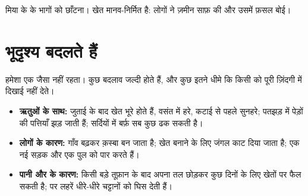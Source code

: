 \begin{omfigure}

{\small मिया के  के भागों को छाँटना। खेत मानव-निर्मित है: लोगों ने
ज़मीन साफ़ की और उसमें फ़सल बोई।}
\label{fig:g1:landscapes-around-us:sort}
\end{omfigure}

\section{भूदृश्य बदलते हैं}

 हमेशा एक जैसा नहीं रहता। कुछ बदलाव जल्दी होते हैं, और कुछ इतने
धीमे कि किसी को पूरी ज़िंदगी में दिखाई नहीं देते।
\begin{itemize}
  \item \textbf{ऋतुओं के साथ:} जुताई के बाद खेत भूरे होते हैं, वसंत में
        हरे, कटाई से पहले सुनहरे; पतझड़ में पेड़ों की पत्तियाँ झड़ जाती हैं;
        सर्दियों में बर्फ़ सब कुछ ढक सकती है।
  \item \textbf{लोगों के कारण:} गाँव बढ़कर क़स्बा बन जाता है; खेत बनाने के
        लिए जंगल काट दिया जाता है; एक नई सड़क और एक पुल  को पार करते
        हैं।
  \item \textbf{पानी और  के कारण:} किसी बड़े तूफ़ान के बाद  अपना
        तल छोड़कर कुछ दिनों के लिए खेतों पर फैल सकती है;  पर लहरें
        धीरे-धीरे चट्टानों को घिस देती हैं।
\end{itemize}

